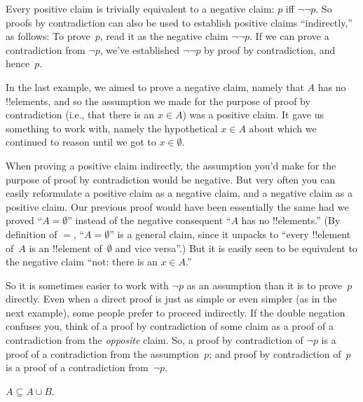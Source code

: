 \documentclass[../../../include/open-logic-section]{subfiles}
\begin{document}
Every positive claim is trivially equivalent to a negative claim: $p$
iff $\lnot\lnot p$.  So proofs by contradiction can also be used to
establish positive claims ``indirectly,'' as follows: To prove~$p$,
read it as the negative claim $\lnot\lnot p$. If we can prove a
contradiction from $\lnot p$, we've established $\lnot\lnot p$ by
proof by contradiction, and hence~$p$.

In the last example, we aimed to prove a negative claim, namely that
$A$ has no !!{element}s, and so the assumption we made for the purpose
of proof by contradiction (i.e., that there is an $x \in A$) was a
positive claim. It gave us something to work with, namely the
hypothetical $x \in A$ about which we continued to reason until we got
to $x \in \emptyset$.

When proving a positive claim indirectly, the assumption you'd make
for the purpose of proof by contradiction would be negative. But very
often you can easily reformulate a positive claim as a negative claim,
and a negative claim as a positive claim.  Our previous proof would
have been essentially the same had we proved ``$A = \emptyset$''
instead of the negative consequent ``$A$ has no !!{element}s.'' (By
definition of $=$, ``$A = \emptyset$'' is a general claim, since it
unpacks to ``every !!{element} of~$A$ is an !!{element} of~$\emptyset$
and vice versa''.) But it is easily seen to be equivalent to the
negative claim ``not: there is an $x \in A$.''

So it is sometimes easier to work with $\lnot p$ as an assumption than
it is to prove~$p$ directly.  Even when a direct proof is just as
simple or even simpler (as in the next example), some people prefer to
proceed indirectly.  If the double negation confuses you, think of a
proof by contradiction of some claim as a proof of a contradiction
from the \emph{opposite} claim. So, a proof by contradiction of $\lnot
p$ is a proof of a contradiction from the assumption~$p$; and proof by
contradiction of~$p$ is a proof of a contradiction from~$\lnot p$.

\begin{prop}
$A \subseteq A \cup B$.
\end{prop}
\end{document}
